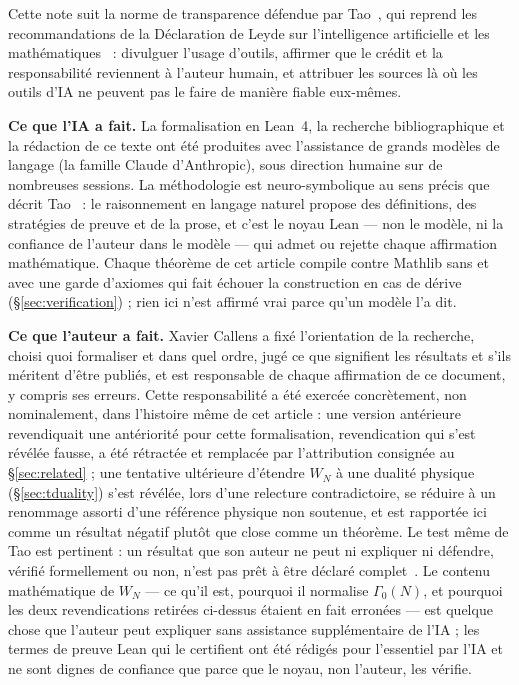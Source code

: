\documentclass[11pt, a4paper]{article}
\newcommand{\lean}[1]{\ifmmode\text{\ttfamily\detokenize{#1}}\else{\ttfamily\detokenize{#1}}\fi}
\theoremstyle{remark}
\begin{document}
Cette note suit la norme de transparence défendue par Tao~\cite{Tao2026AI}, qui reprend les
recommandations de la Déclaration de Leyde sur l'intelligence artificielle et les
mathématiques~\cite{Leiden2026} : divulguer l'usage d'outils, affirmer que le crédit et la
responsabilité reviennent à l'auteur humain, et attribuer les sources là où les outils d'IA ne
peuvent pas le faire de manière fiable eux-mêmes.

\textbf{Ce que l'IA a fait.} La formalisation en Lean~4, la recherche bibliographique et la
rédaction de ce texte ont été produites avec l'assistance de grands modèles de langage (la famille
Claude d'Anthropic), sous direction humaine sur de nombreuses sessions. La méthodologie est
neuro-symbolique au sens précis que décrit Tao~\cite{Tao2026AI} : le raisonnement en langage
naturel propose des définitions, des stratégies de preuve et de la prose, et c'est le noyau Lean ---
non le modèle, ni la confiance de l'auteur dans le modèle --- qui admet ou rejette chaque
affirmation mathématique. Chaque théorème de cet article compile contre Mathlib sans \lean{sorry}
et avec une garde d'axiomes qui fait échouer la construction en cas de dérive
(\S\ref{sec:verification}) ; rien ici n'est affirmé vrai parce qu'un modèle l'a dit.

\textbf{Ce que l'auteur a fait.} Xavier Callens a fixé l'orientation de la recherche, choisi quoi
formaliser et dans quel ordre, jugé ce que signifient les résultats et s'ils méritent d'être
publiés, et est responsable de chaque affirmation de ce document, y compris ses erreurs. Cette
responsabilité a été exercée concrètement, non nominalement, dans l'histoire même de cet article :
une version antérieure revendiquait une antériorité pour cette formalisation, revendication qui
s'est révélée fausse, a été rétractée et remplacée par l'attribution consignée au
\S\ref{sec:related} ; une tentative ultérieure d'étendre $W_N$ à une dualité physique
(\S\ref{sec:tduality}) s'est révélée, lors d'une relecture contradictoire, se réduire à un
renommage assorti d'une référence physique non soutenue, et est rapportée ici comme un résultat
négatif plutôt que close comme un théorème. Le test même de Tao est pertinent : un résultat que son
auteur ne peut ni expliquer ni défendre, vérifié formellement ou non, n'est pas prêt à être déclaré
complet~\cite{Tao2026AI}. Le contenu mathématique de $W_N$ --- ce qu'il est, pourquoi il normalise
$\Gamma_0(N)$, et pourquoi les deux revendications retirées ci-dessus étaient en fait erronées ---
est quelque chose que l'auteur peut expliquer sans assistance supplémentaire de l'IA ; les termes de
preuve Lean qui le certifient ont été rédigés pour l'essentiel par l'IA et ne sont dignes de
confiance que parce que le noyau, non l'auteur, les vérifie.
\end{document}
